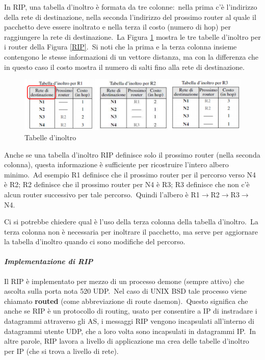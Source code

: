 In RIP, una tabella d'inoltro è formata da tre colonne:\ nella prima c'è l'indirizzo della rete di destinazione, nella seconda l'indirizzo del prossimo router al quale il pacchetto deve essere inoltrato e nella terza il costo (numero di hop) per raggiungere la rete di destinazione.\
La Figura \ref{Tabelle} mostra le tre tabelle d'inoltro per i router della Figura \ref{RIP}.\
Si noti che la prima e la terza colonna insieme contengono le stesse informazioni di un vettore distanza, ma con la differenza che in questo caso il costo mostra il numero di salti fino alla rete di destinazione.

\begin{figure}[H]
    \centering
    \includegraphics[width=\textwidth]{immagini/Tabelle_inoltro_RIP.png}
    \caption{Tabelle d'inoltro}
    \label{Tabelle}
\end{figure}

Anche se una tabella d'inoltro RIP definisce solo il prossimo router (nella seconda colonna), questa informazione è sufficiente per ricostruire l'intero albero minimo.\
Ad esempio R1 definisce che il prossimo router per il percorso verso N4 è R2; R2 definisce che il prossimo router per N4 è R3; R3 definisce che non c'è alcun router successivo per tale percorso.\
Quindi l'albero è R1$\rightarrow$R2$\rightarrow$R3$\rightarrow$N4.

Ci si potrebbe chiedere qual è l'uso della terza colonna della tabella d'inoltro.\
La terza colonna non è necessaria per inoltrare il pacchetto, ma serve per aggiornare la tabella d'inoltro quando ci sono modifiche del percorso.

\paragraph{\emph{Implementazione di RIP}}

Il RIP è implementato per mezzo di un processo demone (sempre attivo) che ascolta sulla porta nota 520 UDP.\
Nel caso di UNIX BSD tale processo viene chiamato \textbf{routed} (come abbreviazione di route daemon).\
Questo significa che anche se RIP è un protocollo di routing, usato per consentire a IP di instradare i datagrammi attraverso gli AS, i messaggi RIP vengono incapsulati all'interno di datagrammi utente UDP, che a loro volta sono incapsulati in datagrammi IP.\
In altre parole, RIP lavora a livello di applicazione ma crea delle tabelle d'inoltro per IP (che si trova a livello di rete).\

